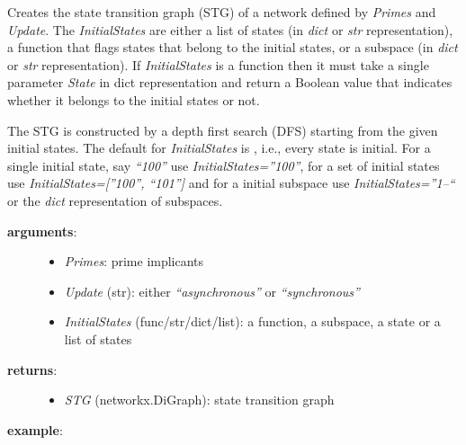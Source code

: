 \documentclass[letterpaper,10pt,english]{sphinxmanual}
\begin{document}
\begin{fulllineitems}
\label{StateTransitionGraphs:PyBoolNet.StateTransitionGraphs.primes2stg}
Creates the state transition graph (STG) of a network defined by \emph{Primes} and \emph{Update}.
The \emph{InitialStates} are either a list of states (in \emph{dict} or \emph{str} representation),
a function that flags states that belong to the initial states, or
a subspace (in \emph{dict} or \emph{str} representation).
If \emph{InitialStates} is a function then it must take a single parameter \emph{State} in dict representation
and return a Boolean value that indicates whether it belongs to the initial states or not.

The STG is constructed by a depth first search (DFS) starting from the given initial states.
The default for \emph{InitialStates} is , i.e., every state is initial.
For a single initial state, say \emph{``100''} use \emph{InitialStates=''100''},
for a set of initial states use \emph{InitialStates={[}''100'', ``101''{]}} and
for a initial subspace use \emph{InitialStates=''1--``} or the \emph{dict} representation of subspaces.
\begin{description}
\item[{\textbf{arguments}:}] \leavevmode\begin{itemize}
\item {} 
\emph{Primes}: prime implicants

\item {} 
\emph{Update} (str): either \emph{``asynchronous''} or \emph{``synchronous''}

\item {} 
\emph{InitialStates} (func/str/dict/list): a function, a subspace, a state or a list of states

\end{itemize}

\item[{\textbf{returns}:}] \leavevmode\begin{itemize}
\item {} 
\emph{STG} (networkx.DiGraph): state transition graph

\end{itemize}

\end{description}

\textbf{example}:


\end{fulllineitems}
\end{document}
